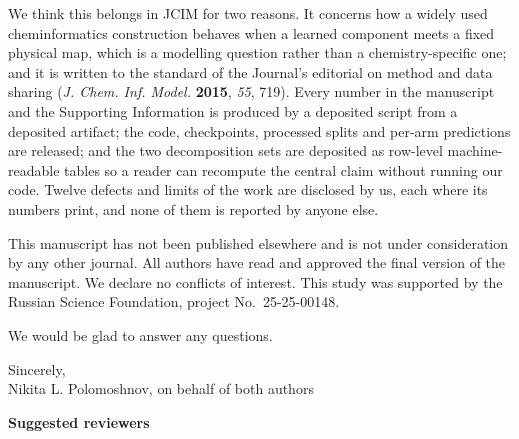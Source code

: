 \documentclass[11pt]{article}
\begin{document}
We think this belongs in JCIM for two reasons. It concerns how a widely used cheminformatics
construction behaves when a learned component meets a fixed physical map, which is a modelling
question rather than a chemistry-specific one; and it is written to the standard of the Journal's
editorial on method and data sharing (\emph{J. Chem. Inf. Model.} \textbf{2015}, \emph{55}, 719).
Every number in the manuscript and the Supporting Information is produced by a deposited script
from a deposited artifact; the code, checkpoints, processed splits and per-arm predictions are
released; and the two decomposition sets are deposited as row-level machine-readable tables so a
reader can recompute the central claim without running our code. Twelve defects and limits of the
work are disclosed by us, each where its numbers print, and none of them is reported by anyone
else.

This manuscript has not been published elsewhere and is not under consideration by any other
journal. All authors have read and approved the final version of the manuscript. We declare no
conflicts of interest. This study was supported by the Russian Science Foundation, project
No.~25-25-00148.

\vspace{2mm}
\noindent
We would be glad to answer any questions.

\vspace{4mm}
\noindent
Sincerely,\\[2pt]
Nikita L. Polomoshnov, on behalf of both authors

\vspace{6mm}
\noindent\textbf{Suggested reviewers}
\end{document}
